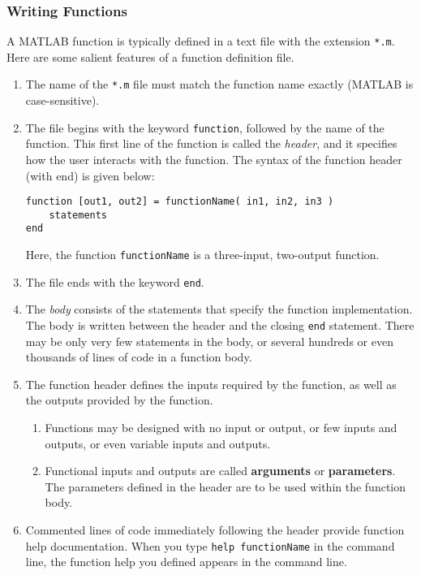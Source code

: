\subsubsection{Writing Functions}
A MATLAB function is typically defined in a text file with the extension \texttt{*.m}. Here are some salient features of a function definition file.

\begin{enumerate}
\item The name of the \texttt{*.m} file must match the function name exactly (MATLAB is case-sensitive).
\item The file begins with the keyword \texttt{function}, followed by the name of the function. This first line of the function is called the \textit{header}, and it specifies how the user interacts with the function. The syntax of the function header (with end) is given below:
\begin{lstlisting}[style=Matlab-editor]
function [out1, out2] = functionName( in1, in2, in3 )
	statements
end
\end{lstlisting}
Here, the function \texttt{functionName} is a three-input, two-output function.
\item The file ends with the keyword \texttt{end}.
\item The \textit{body} consists of the statements that specify the function implementation. The body is written between the header and the closing \texttt{end} statement. There may be only very few statements in the body, or several hundreds or even thousands of lines of code in a function body.
\item The function header defines the inputs required by the function, as well as the outputs provided by the function.
\begin{enumerate}
\item Functions may be designed with no input or output, or few inputs and outputs, or even variable inputs and outputs.
\item Functional inputs and outputs are called \textbf{arguments} or \textbf{parameters}. The parameters defined in the header are to be used within the function body.
\end{enumerate}
\item Commented lines of code immediately following the header provide function help documentation. When you type \texttt{help functionName} in the command line, the function help you defined appears in the command line.
\end{enumerate}

